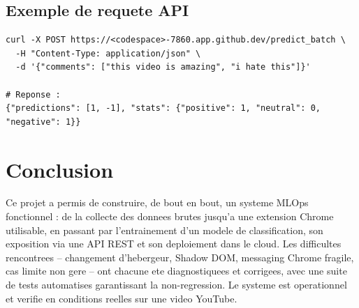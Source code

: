 \documentclass[11pt,a4paper]{article}
\begin{document}
\subsection{Exemple de requete API}

\begin{verbatim}
curl -X POST https://<codespace>-7860.app.github.dev/predict_batch \
  -H "Content-Type: application/json" \
  -d '{"comments": ["this video is amazing", "i hate this"]}'

# Reponse :
{"predictions": [1, -1], "stats": {"positive": 1, "neutral": 0, "negative": 1}}
\end{verbatim}

\section{Conclusion}

Ce projet a permis de construire, de bout en bout, un systeme MLOps fonctionnel : de la collecte des donnees brutes jusqu'a une extension Chrome utilisable, en passant par l'entrainement d'un modele de classification, son exposition via une API REST et son deploiement dans le cloud. Les difficultes rencontrees -- changement d'hebergeur, Shadow DOM, messaging Chrome fragile, cas limite non gere -- ont chacune ete diagnostiquees et corrigees, avec une suite de tests automatises garantissant la non-regression. Le systeme est operationnel et verifie en conditions reelles sur une video YouTube.
\end{document}

